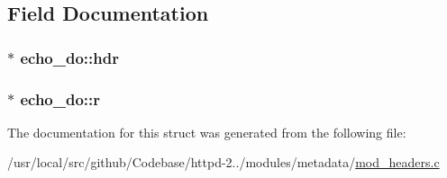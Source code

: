 \subsection{Field Documentation}
\subsubsection[{\texorpdfstring{hdr}{hdr}}]{$\ast$ echo\+\_\+do\+::hdr}\hypertarget{structecho__do_a5d3f6ad741a7565f94be5b71f8fa58da}{}\label{structecho__do_a5d3f6ad741a7565f94be5b71f8fa58da}
\subsubsection[{\texorpdfstring{r}{r}}]{$\ast$ echo\+\_\+do\+::r}\hypertarget{structecho__do_a65c7735c0a4a3c9e143ee5f0e61be770}{}\label{structecho__do_a65c7735c0a4a3c9e143ee5f0e61be770}


The documentation for this struct was generated from the following file\+:\begin{DoxyCompactItemize}
\item 
/usr/local/src/github/\+Codebase/httpd-\/2../modules/metadata/\hyperlink{mod__headers_8c}{mod\+\_\+headers.\+c}\end{DoxyCompactItemize}
